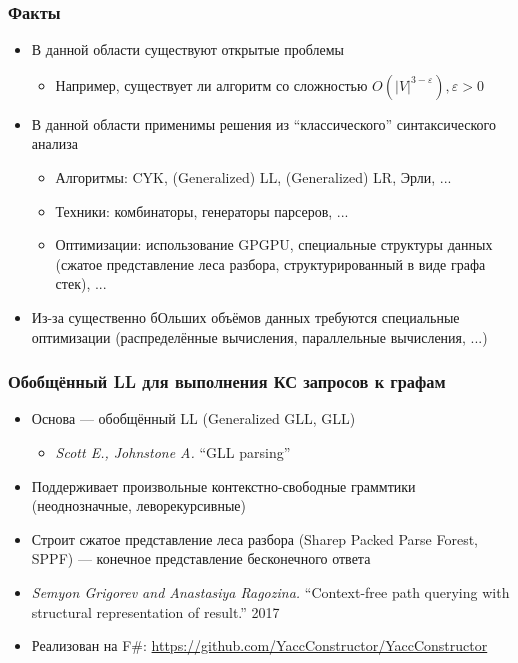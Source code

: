 \documentclass[xcolor=table,aspectratio=169]{beamer}
\begin{document}
\begin{frame}[fragile]
  \transwipe[direction=90]
  \frametitle{Факты}
  \begin{itemize}
  \item В данной области существуют открытые проблемы
    \begin{itemize}
        \item Например, существует ли алгоритм со сложностью $O(|V|^{3-\varepsilon}), \varepsilon > 0$
    \end{itemize}
  \item В данной области применимы решения из ``классического'' синтаксического анализа
    \begin{itemize}
        \item Алгоритмы: CYK, (Generalized) LL, (Generalized) LR, Эрли, ...
        \item Техники: комбинаторы, генераторы парсеров, ... 
        \item Оптимизации: использование GPGPU, специальные структуры данных (сжатое представление леса разбора, структурированный в виде графа стек), ...
    \end{itemize}
  \item Из-за существенно бОльших объёмов данных требуются специальные оптимизации (распределённые вычисления, параллельные вычисления, ...)
  \end{itemize}

\end{frame}

\begin{frame}[fragile]
  \transwipe[direction=90]
  \frametitle{Обобщённый LL для выполнения КС запросов к графам}

\begin{itemize} 
\item Основа --- обобщённый LL (Generalized GLL, GLL)
\begin{itemize} 
  \item \emph{Scott E., Johnstone A.} ``GLL parsing''
\end{itemize}
\item Поддерживает произвольные контекстно-свободные граммтики (неоднозначные, леворекурсивные)
\item Строит сжатое представление леса разбора (Sharep Packed Parse Forest, SPPF) --- конечное представление бесконечного ответа
\item \emph{Semyon Grigorev and Anastasiya Ragozina.} ``Context-free path querying with structural representation of result.'' 2017
\item Реализован на F\#: \url{https://github.com/YaccConstructor/YaccConstructor}
\end{itemize}
\end{frame}
\end{document}
